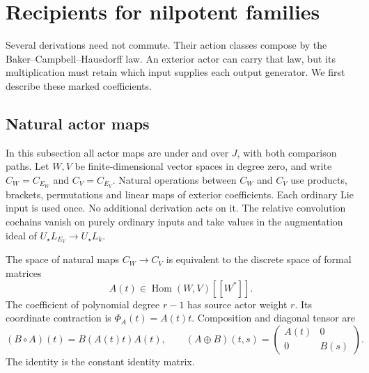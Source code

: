 \section{Recipients for nilpotent families}
\label{sec:vol2-nilpotent-recipients}

Several derivations need not commute. Their action classes compose
by the Baker--Campbell--Hausdorff law. An exterior actor can carry
that law, but its multiplication must retain which input supplies
each output generator. We first describe these marked coefficients.

\subsection{Natural actor maps}

In this subsection all actor maps are under and over $J$, with both
comparison paths. Let $W,V$ be finite-dimensional vector spaces
in degree zero, and write $C_W=C_{E_W}$ and $C_V=C_{E_V}$.
Natural operations between $C_W$
and $C_V$ use products, brackets, permutations and linear maps of
exterior coefficients. Each ordinary Lie input is used once.
No additional derivation acts on it. The relative convolution
cochains vanish on purely ordinary inputs and take values in the
augmentation ideal of $U_\star L_{E_V}\to U_\star L_k$.

\begin{theorem}\label{thm:vol2-natural-actor-maps}
The space of natural maps $C_W\to C_V$ is equivalent to the
discrete space of formal matrices
\[
 A(t)\in\operatorname{Hom}(W,V)[[W^*]].
\]
The coefficient of polynomial degree $r-1$ has source actor
weight $r$. Its coordinate contraction is $\Phi_A(t)=A(t)t$.
Composition and diagonal tensor are
\begin{equation}\label{eq:vol2-marked-composition}
 (B\circ A)(t)=B(A(t)t)A(t),\qquad
 (A\oplus B)(t,s)=
 \begin{pmatrix}A(t)&0\\0&B(s)\end{pmatrix}.
\end{equation}
The identity is the constant identity matrix.
\end{theorem}

